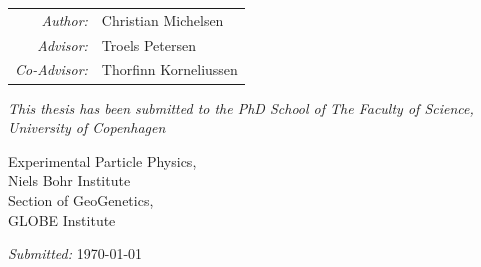 \documentclass{article}
\begin{document}
\begin{titlepage}
\begin{center}
        \vspace{5cm}
        \begin{center}
            {\renewcommand{\arraystretch}{1.5}%
                \begin{tabular}{ r l }
                    \emph{Author:}     & \textcolor{KU}{Christian Michelsen}   \\
                    \emph{Advisor:}    & \textcolor{KU}{Troels Petersen}       \\
                    \emph{Co-Advisor:} & \textcolor{KU}{Thorfinn Korneliussen} \\
                \end{tabular}
            }
        \end{center}

        \vspace{1cm}
        \emph{This thesis has been submitted to the PhD School of The Faculty of Science, University of Copenhagen}


        \vspace{1cm}
        Experimental Particle Physics, \\
        Niels Bohr Institute \\
        \vspace{0.2cm}
        Section of GeoGenetics, \\
        GLOBE Institute

        \vfill
        \emph{Submitted:} \textcolor{KU}{\today}


    \end{center}
\end{titlepage}
\end{document}
